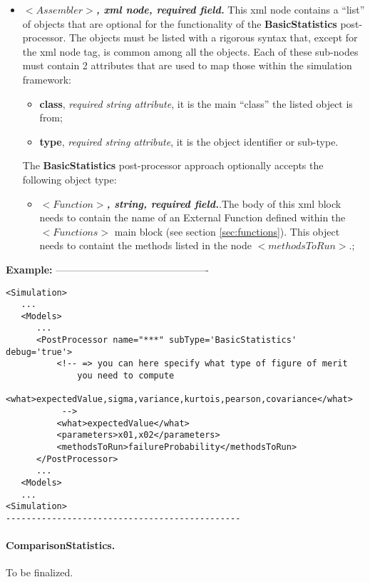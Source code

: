 \begin{itemize}
\item $<Assembler>$\textbf{\textit{, xml node, required field.}} This xml node contains a ``list'' of objects that are  optional for the functionality of the  \textbf{BasicStatistics} post-processor. The objects must be listed with a rigorous syntax that, except for the xml node tag, is common among all the objects.  
Each of these sub-nodes  must contain 2 attributes that are used to map those within the simulation framework:
   \begin{itemize}
     \item \textbf{class}, \textit{required string attribute}, it is the main ``class'' the listed object is from;
     \item \textbf{type},  \textit{required string attribute}, it is the object identifier or sub-type.
    \end{itemize}
The  \textbf{BasicStatistics} post-processor approach  optionally accepts the following object type:
   \begin{itemize}
       \item $<Function>$\textbf{\textit{, string, required field.}}.The body of this xml block needs to contain the name of an External Function defined within the $<Functions>$ main block (see section \ref{sec:functions}). This object needs to containt the methods listed in the node $<methodsToRun>$.;
    \end{itemize}
\end{itemize}
\textbf{Example:}
----------------------------------------------
\begin{lstlisting}[style=XML]
<Simulation>
   ...
   <Models>
      ...
      <PostProcessor name="***" subType='BasicStatistics'  debug='true'>
          <!-- => you can here specify what type of figure of merit
              you need to compute
             <what>expectedValue,sigma,variance,kurtois,pearson,covariance</what> 
           -->
          <what>expectedValue</what>
          <parameters>x01,x02</parameters>
          <methodsToRun>failureProbability</methodsToRun>
      </PostProcessor>
      ...
   <Models>
   ...
<Simulation>
----------------------------------------------
\end{lstlisting}

\paragraph{ComparisonStatistics.}
\label{ComparisonStatistics}
To be finalized.


